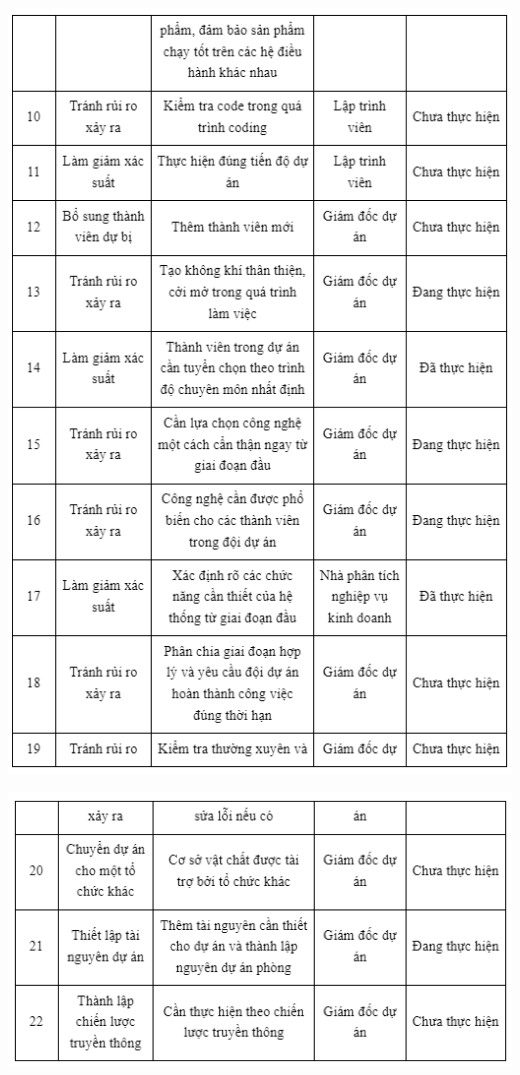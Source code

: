 \documentclass[12pt]{article}
\begin{document}
\hspace{-0.6cm}\includegraphics[width=15cm]{II_7_5_2.png}
\par
\hspace{-0.6cm}\includegraphics[width=15cm]{II_7_5_3.png}
\vspace{0.5cm}
\end{document}
